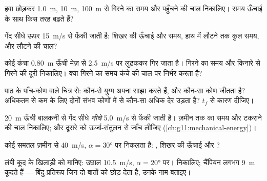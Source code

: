 \begin{exercise}[$\star$]\label{exo:g12:projectile-motion:3}
हवा छोड़कर \qty{1.0}{m}, \qty{10}{m}, \qty{100}{m} से गिरने का समय और पहुँचने की चाल
निकालिए। समय ऊँचाई के साथ किस तरह बढ़ते हैं?
\end{exercise}

\begin{exercise}[$\star$]\label{exo:g12:projectile-motion:4}
गेंद सीधे ऊपर \qty{15}{m/s} से फेंकी जाती है: शिखर की ऊँचाई और समय, हाथ में लौटने
तक कुल समय, और लौटने की चाल?
\end{exercise}

\begin{exercise}[$\star$]\label{exo:g12:projectile-motion:5}
कोई कंचा \qty{0.80}{m} ऊँची मेज़ से \qty{2.5}{m/s} पर लुढ़ककर गिर जाता है। गिरने का समय और
किनारे से गिरने की दूरी निकालिए। क्या गिरने का समय कंचे की चाल पर निर्भर करता
है?
\end{exercise}

\begin{exercise}[$\star\star$]\label{exo:g12:projectile-motion:6}
पाठ के पाँच-कोण वाले चित्र से: कौन-से  युग्म अपना
 साझा करते हैं, और कौन-सा कोण जीतता है? अधिकतम से कम
 के लिए दोनों संभव कोणों में से कौन-सा अधिक देर उड़ता है? $t_f$
से कारण दीजिए।
\end{exercise}

\begin{exercise}[$\star\star$]\label{exo:g12:projectile-motion:7}
\qty{20}{m} ऊँची बालकनी से गेंद सीधे \emph{नीचे} \qty{5.0}{m/s} से फेंकी जाती है। ज़मीन
तक का समय और टकराने की चाल निकालिए; और दूसरे को ऊर्जा-संतुलन से जाँच
लीजिए (\cref{ch:g11:mechanical-energy})।
\end{exercise}

\begin{exercise}[$\star\star$]\label{exo:g12:projectile-motion:8}
कोई  समतल ज़मीन से \qty{40}{m/s}, $\alpha = \ang{30}$ पर निकलता है:
, शिखर की ऊँचाई और ?
\end{exercise}

\begin{exercise}[$\star\star$]\label{exo:g12:projectile-motion:9}
लंबी कूद के खिलाड़ी को  मानिए: उछाल \qty{10.5}{m/s}, $\alpha = \ang{20}$ पर।
 निकालिए; चैंपियन लगभग \qty{9}{m} कूदते हैं --- बिंदु-प्रतिरूप जिन
दो बातों को छोड़ देता है, उनके नाम बताइए।
\end{exercise}

